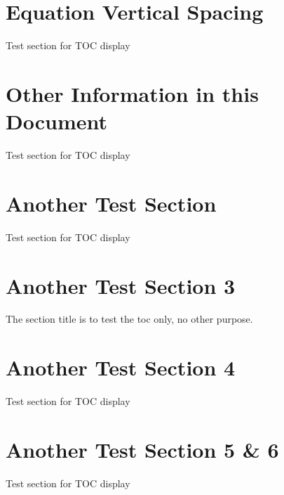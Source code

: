 \section{Equation Vertical Spacing}

Test section for TOC display

\section{Other Information in this Document}
Test section for TOC display

\section{Another Test Section}
Test section for TOC display

\section{Another Test Section 3}
The section title is to test the toc only, no other purpose.

\section{Another Test Section 4}
Test section for TOC display

\section{Another Test Section 5 \& 6}
Test section for TOC display







 





 

 
 


